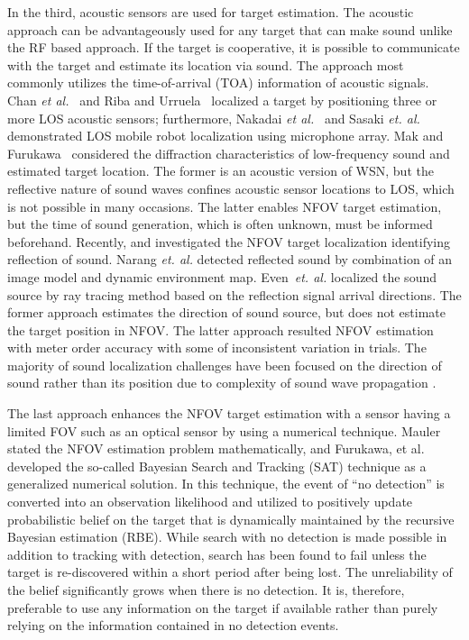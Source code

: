 In the third, acoustic sensors are used for target estimation. The acoustic approach can be advantageously used for any target that can make sound unlike the RF based approach. If the target is cooperative, it is possible to communicate with the target and estimate its location via sound.  The approach most commonly utilizes the time-of-arrival (TOA) information of acoustic signals. Chan \textit{et al.}~\cite{cha06} and Riba and Urruela~\cite{rib05} localized a target by positioning three or more LOS acoustic sensors; furthermore, Nakadai \textit{et al.}~\cite{nakadai06} and Sasaki \textit{et. al.}~\cite{sasaki09} demonstrated LOS mobile robot localization using microphone array. Mak and Furukawa~\cite{Mak2009} considered the diffraction characteristics of low-frequency sound and estimated target location.  The former is an acoustic version of WSN, but the reflective nature of sound waves confines acoustic sensor locations to LOS, which is not possible in many occasions.  The latter enables NFOV target estimation, but the time of sound generation, which is often unknown, must be informed beforehand. Recently, \cite{narang2014auditory} and \cite{even2014audio} investigated the NFOV target localization identifying reflection of sound. Narang \textit{et. al.} detected reflected sound by  combination of an image model and dynamic environment map. Even~\textit{et. al.} localized the sound source by ray tracing method based on the reflection signal arrival directions. The former approach estimates the direction of sound source, but does not estimate the target position in NFOV. The latter approach resulted NFOV estimation with meter order accuracy with some of inconsistent variation in trials. The majority of sound localization challenges have been focused on the direction of sound rather than its position due to complexity of sound wave propagation \cite{mic03,sva12,lu10}. 

The last approach enhances the NFOV target estimation with a sensor having a limited FOV such as an optical sensor by using a numerical technique.  Mauler \cite{mau03} stated the NFOV estimation problem mathematically, and Furukawa, et al. \cite{fur06,fur12} developed the so-called Bayesian Search and Tracking (SAT) technique as a generalized numerical solution.  In this technique, the event of ``no detection'' is converted into an observation likelihood and utilized to positively update probabilistic belief on the target that is dynamically maintained by the recursive Bayesian estimation (RBE).  While search with no detection is made possible in addition to tracking with detection, search has been found to fail unless the target is re-discovered within a short period after being lost.  The unreliability of the belief significantly grows when there is no detection.  It is, therefore, preferable to use any information on the target if available rather than purely relying on the information contained in no detection events.
  
